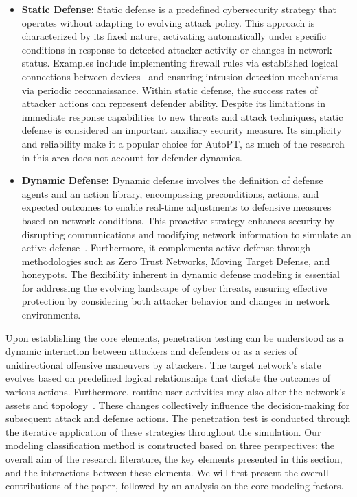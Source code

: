 \begin{itemize}
    \item \textbf{Static Defense:} Static defense is a predefined cybersecurity strategy that operates without adapting to evolving attack policy. This approach is characterized by its fixed nature, activating automatically under specific conditions in response to detected attacker activity or changes in network status. 
    Examples include implementing firewall rules via established logical connections between devices~\cite{schwartz2019autonomous} and ensuring intrusion detection mechanisms via periodic reconnaissance. 
    Within static defense, the success rates of attacker actions can represent defender ability.
    Despite its limitations in immediate response capabilities to new threats and attack techniques, static defense is considered an important auxiliary security measure. Its simplicity and reliability make it a popular choice for AutoPT, as much of the research in this area does not account for defender dynamics.

    \item \textbf{Dynamic Defense:} Dynamic defense involves the definition of  defense agents and an action library, encompassing preconditions, actions, and expected outcomes to enable real-time adjustments to defensive measures based on network conditions. This proactive strategy enhances security by disrupting communications and modifying network information to simulate an active defense~\cite{paul2019learning,elderman2017adversarial}. Furthermore, it complements active defense through methodologies such as Zero Trust Networks, Moving Target Defense, and honeypots. The flexibility inherent in dynamic defense modeling is essential for addressing the evolving landscape of cyber threats, ensuring effective protection by considering both attacker behavior and changes in network environments.

\end{itemize}

Upon establishing the core elements, penetration testing can be understood as a dynamic interaction between attackers and defenders or as a series of unidirectional offensive maneuvers by attackers. 
The target network's state evolves based on predefined logical relationships that dictate the outcomes of various actions. Furthermore, routine user activities may also alter the network's assets and topology~\cite{applebaum2017analysis}. These changes collectively influence the decision-making for subsequent attack and defense actions.  The penetration test is conducted through the iterative application of these strategies throughout the simulation.
Our modeling classification method is constructed based on three perspectives: the overall aim of the research literature, the key elements presented in this section, and the interactions between these elements.
We will first present the overall contributions of the paper, followed by an analysis on the core modeling factors.

